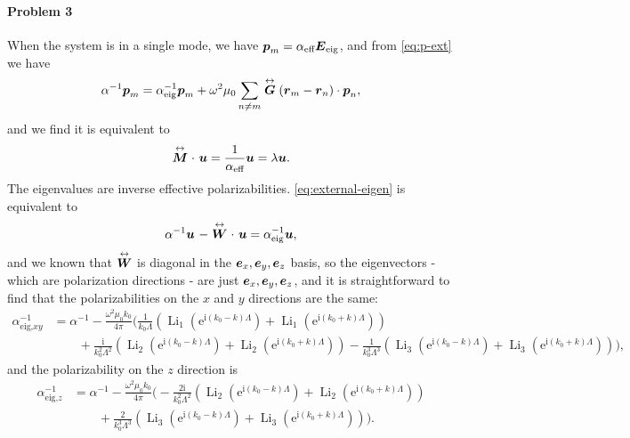 \documentclass[hyperref, a4paper]{article}
\newcommand*{\ii}{\mathrm{i}}
\newcommand*{\ee}{\mathrm{e}}
\DeclareMathOperator{\li}{Li}
\renewcommand{\tensor}[1]{ \stackrel{\leftrightarrow}{\vb*{#1}}}
\begin{document}
\paragraph{Problem 3} When the system is in a single mode, we have $\vb*{p}_m = \alpha_\text{eff} 
\vb*{E}_\text{eig}$, and from \eqref{eq:p-ext} we have 
\[
    \alpha^{-1} \vb*{p}_m = \alpha_\text{eig}^{-1} \vb*{p}_m + \omega^2 \mu_0 \sum_{n \neq m} \tensor{\vb*{G}}(\vb*{r}_m - \vb*{r}_n) \cdot \vb*{p}_n,
\]
and we find it is equivalent to 
\begin{equation}
    \tensor{\vb*{M}} \cdot \ \vb*{u} = \frac{1}{\alpha_\text{eff}} \vb*{u} = \lambda \vb*{u}.
    \label{eq:external-eigen}
\end{equation}
The eigenvalues are inverse effective polarizabilities. \eqref{eq:external-eigen} is equivalent to 
\[
    \alpha^{-1} \vb*{u} \ - \tensor{\vb*{W}} \cdot \ \vb*{u} = \alpha_\text{eig}^{-1} \vb*{u},
\]
and we known that $\tensor{\vb*{W}}$ is diagonal in the $\vb*{e}_x, \vb*{e}_y, \vb*{e}_z$ basis, so the
eigenvectors - which are polarization directions - are just $\vb*{e}_x, \vb*{e}_y, \vb*{e}_z$, and it is straightforward to find that the 
polarizabilities on the $x$ and $y$ directions are the same: 
\begin{equation}
    \begin{aligned}
        \alpha_\text{eig,$xy$}^{-1} &= \alpha^{-1} - \frac{\omega^2 \mu_0 k_0}{4 \pi} \biggl( \frac{1}{k_0 \Lambda} (\li_1(\ee^{\ii (k_0 - k) \Lambda}) + \li_1(\ee^{\ii (k_0 + k) \Lambda})) \\
        &\quad \quad + \frac{\ii}{k_0^2 \Lambda^2} (\li_2(\ee^{\ii (k_0 - k) \Lambda}) + \li_2(\ee^{\ii (k_0 + k) \Lambda})) - \frac{1}{k_0^3 \Lambda^3} (\li_3(\ee^{\ii (k_0 - k) \Lambda}) + \li_3(\ee^{\ii (k_0 + k) \Lambda})) \biggr),
    \end{aligned}
    \label{eq:alpha-xy}
\end{equation}
and the polarizability on the $z$ direction is 
\begin{equation}
    \begin{aligned}
        \alpha_\text{eig,$z$}^{-1} &= \alpha^{-1} - \frac{\omega^2 \mu_0 k_0}{4 \pi} \biggl( - \frac{2\ii}{k_0^2 \Lambda^2} (\li_2(\ee^{\ii (k_0 - k) \Lambda}) + \li_2(\ee^{\ii (k_0 + k) \Lambda})) \\
        &\quad \quad  + \frac{2}{k_0^3 \Lambda^3} (\li_3(\ee^{\ii (k_0 - k) \Lambda}) + \li_3(\ee^{\ii (k_0 + k) \Lambda})) \biggr).
    \end{aligned}
    \label{eq:alpha-z}
\end{equation}
\end{document}
